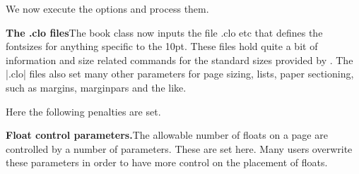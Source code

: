 \begin{teX}
\if@compatibility\else
{}
\fi
{}
\end{teX}

We now execute the options and process them.
\begin{teX}
\ProcessOptions
\end{teX}

\begin{multicols}{2}
\textbf{The .clo files}\quad The book class now inputs the file .clo etc that defines the fontsizes
 for anything specific to the 10pt. These files hold quite a bit of information and size related commands for the
standard sizes provided by \latex. The |.clo| files also set many other parameters for page sizing, lists, paper sectioning, such as margins, marginpars and the like.
\end{multicols}

\begin{teX}

\setlength{}
\setlength{}
\renewcommand\baselinestretch{}
\setlength\parskip{0\p@ \@plus \p@}
\end{teX}

\begin{multicols}{2}
 Here the following penalties are set.
\end{multicols}

\begin{teX}
\end{teX}

\begin{multicols}{2}
\textbf{Float control parameters.}\quad The allowable number of floats on a page are controlled by a number of parameters. These are set here. Many users overwrite these parameters in order to have more control on the placement of floats.
\end{multicols}


\begin{teX}
\setcounter{topnumber}{2}
\renewcommand\topfraction{.7}
\setcounter{bottomnumber}{1}
\renewcommand\bottomfraction{.3}
\setcounter{totalnumber}{3}
\renewcommand\textfraction{.2}
\renewcommand\floatpagefraction{.5}
\setcounter{dbltopnumber}{2}
\renewcommand\dbltopfraction{.7}
\renewcommand\dblfloatpagefraction{.5}
\end{teX}

